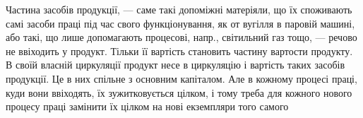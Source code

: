 Частина засобів продукції, — саме такі допоміжні матеріяли, що їх
споживають самі засоби праці під час свого функціонування, як от вугілля
в паровій машині, або такі, що лише допомагають процесові,
напр., світильний газ тощо, — речово не ввіходить у продукт. Тільки її
вартість становить частину вартости продукту. В своїй власній циркуляції
продукт несе в циркуляцію і вартість таких засобів продукції. Це в
них спільне з основним капіталом. Але в кожному процесі праці, куди
вони ввіходять, їх зужитковується цілком, і тому треба для кожного нового
процесу праці замінити їх цілком на нові екземпляри того самого
\parbreak{}  %

